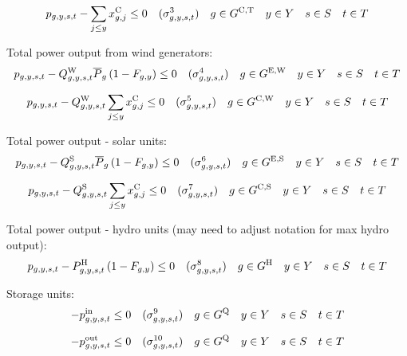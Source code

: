 \documentclass{article}
\newcommand{\sScenarioSets}{\quad  \iYear \in \sYears \quad  \iScenario \in \sScenarios \quad  \iInterval \in \sIntervals}
\begin{document}
\begin{equation}
	\vPower - \sum\limits_{\iYearAlias \leq \iYear} \vInstalledCapacity[\iGenerator,\iYearAlias] \leq 0 \quad (\dMaxPowerOutputCandidateThermal) \quad  \iGenerator \in \sGeneratorsCandidateThermal \sScenarioSets
\end{equation}

Total power output from wind generators:
\begin{equation}
	\vPower - \cCapacityFactorWind \cPowerOutputMax[\iGenerator] \left(1 - \cRetirementIndicator\right) \leq 0 \quad (\dMaxPowerOutputWindExisting) \quad  \iGenerator \in \sGeneratorsExistingWind \sScenarioSets
\end{equation}

\begin{equation}
	\vPower - \cCapacityFactorWind \sum\limits_{\iYearAlias \leq \iYear} \vInstalledCapacity[\iGenerator,\iYearAlias] \leq 0 \quad (\dMaxPowerOutputWindCandidate) \quad  \iGenerator \in \sGeneratorsCandidateWind \sScenarioSets
\end{equation}

Total power output - solar units:
\begin{equation}
	\vPower - \cCapacityFactorSolar \cPowerOutputMax[\iGenerator] \left(1 - \cRetirementIndicator\right) \leq 0 \quad (\dMaxPowerOutputSolarExisting) \quad  \iGenerator \in \sGeneratorsExistingSolar \sScenarioSets
\end{equation}

\begin{equation}
	\vPower - \cCapacityFactorSolar \sum\limits_{\iYearAlias \leq \iYear} \vInstalledCapacity[\iGenerator,\iYearAlias] \leq 0 \quad (\dMaxPowerOutputSolarCandidate) \quad  \iGenerator \in \sGeneratorsCandidateSolar \sScenarioSets
\end{equation}

Total power output - hydro units (may need to adjust notation for max hydro output):
\begin{equation}
	\vPower - \cPowerOutputHydro \left(1 - \cRetirementIndicator\right) \leq 0 \quad (\dMaxPowerOutputHydro) \quad  \iGenerator \in \sGeneratorsHydro \sScenarioSets
\end{equation}

Storage units:
\begin{equation}
	-\vPowerIn \leq 0 \quad (\dNonNegativeCharging) \quad  \iGenerator \in \sStorage \sScenarioSets
\end{equation}

\begin{equation}
	-\vPowerOut \leq 0 \quad (\dNonNegativeDischarging) \quad  \iGenerator \in \sStorage \sScenarioSets
\end{equation}
\end{document}
